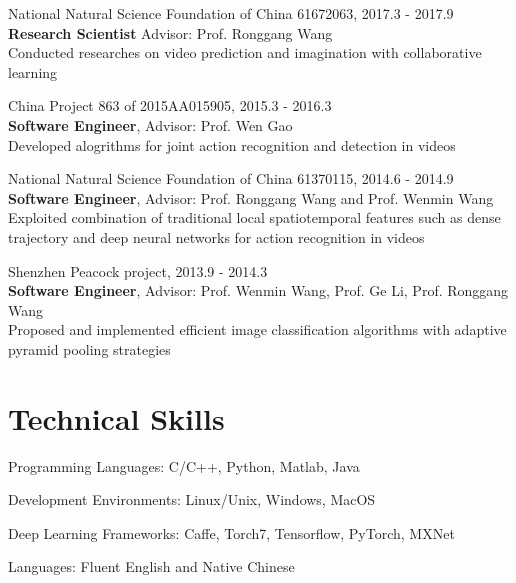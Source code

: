 \documentclass[letterpaper]{article}
\renewenvironment{itemize}{
  \begin{list}{}{
    \setlength{\leftmargin}{1.5em}
  }
}{
  \end{list}
}
\begin{document}
\begin{itemize}
    \item National Natural Science Foundation of China 61672063, 2017.3 - 2017.9 \\ 
       \textbf{Research Scientist} Advisor: Prof. Ronggang Wang \\
        Conducted researches on video prediction and imagination with collaborative learning \\

    \item China Project 863 of 2015AA015905, 2015.3 - 2016.3 \\ 
        \textbf{Software Engineer}, Advisor: Prof. Wen Gao \\
        Developed alogrithms for joint action recognition and detection in videos \\

    \item National Natural Science Foundation of China 61370115, 2014.6 - 2014.9 \\ 
        \textbf{Software Engineer}, Advisor: Prof. Ronggang Wang and Prof. Wenmin Wang  \\
        Exploited combination of traditional local spatiotemporal features such as dense trajectory and deep neural networks for action recognition in videos \\

    \item Shenzhen Peacock project, 2013.9 - 2014.3 \\ 
        \textbf{Software Engineer}, Advisor: Prof. Wenmin Wang, Prof. Ge Li, Prof. Ronggang Wang \\
        Proposed and implemented efficient image classification algorithms with adaptive pyramid pooling strategies \\

\end{itemize}


\section*{Technical Skills}


\begin{itemize}
    \item   Programming Languages: C/C++, Python, Matlab, Java
    \item   Development Environments: Linux/Unix, Windows, MacOS
    \item   Deep Learning Frameworks: Caffe, Torch7, Tensorflow, PyTorch, MXNet
    \item   Languages:   Fluent English and Native Chinese
\end{itemize}
\end{document}
